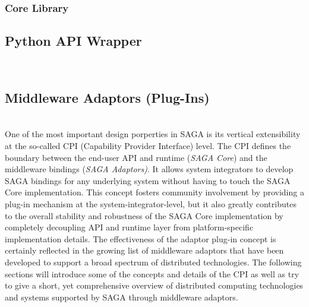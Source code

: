 

 
  \subsubsection{Core Library}


  \subsection{Python API Wrapper}
  \\
  

  \subsection{Middleware Adaptors (Plug-Ins)}
  \\
   One of the most important design porperties in SAGA is its vertical
   extensibility at the so-called CPI (Capability Provider Interface) level.
   The CPI defines the boundary between the end-user  API and runtime (\textit{SAGA Core}) and the middleware
   bindings (\textit{SAGA Adaptors)}.  It allows system integrators to develop
   SAGA bindings for any underlying system without having to touch the SAGA
   Core implementation.  This concept fosters community involvement by
   providing a plug-in mechanism at the  system-integrator-level, but it also greatly contributes to the
   overall stability and robustness of the SAGA Core implementation by
   completely decoupling API and runtime layer from platform-specific
   implementation details. The effectiveness of the adaptor plug-in concept is
   certainly reflected in the growing list of middleware adaptors that have
   been developed to support a broad spectrum of distributed technologies. The
   following sections will introduce some of the concepts and details of the
   CPI as well as try to give a short, yet comprehensive overview of
   distributed computing technologies and systems supported by SAGA through
   middleware adaptors.

